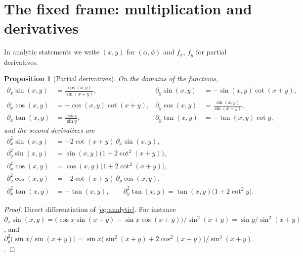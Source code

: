\documentclass[11pt]{amsart}
\newtheorem{prop}[thm]{Proposition}
\theoremstyle{definition}
\theoremstyle{remark}
\numberwithin{equation}{section}
\begin{document}
\section{The fixed frame: multiplication and derivatives}
\label{sec:calculus}

In analytic statements we write $(x,y)$ for $(\alpha,\phi)$ and
$f_x$, $f_y$ for partial derivatives.

\begin{prop}[Partial derivatives]
\label{prop:partials}
On the domains of the functions,
\begin{align*}
\partial_x \sin(x,y) &= \frac{\cos(x,y)}{\sin(x+y)}, &
\partial_y \sin(x,y) &= -\sin(x,y)\cot(x+y), \\
\partial_x \cos(x,y) &= -\cos(x,y)\cot(x+y), &
\partial_y \cos(x,y) &= \frac{\sin(x,y)}{\sin(x+y)}, \\
\partial_x \tan(x,y) &= \frac{\cos x}{\sin y}, &
\partial_y \tan(x,y) &= -\tan(x,y)\cot y,
\end{align*}
and the second derivatives are
\begin{align*}
\partial_x^2 \sin(x,y) &= -2\cot(x+y)\,\partial_x\sin(x,y), \\
\partial_y^2 \sin(x,y) &= \sin(x,y)\bigl(1 + 2\cot^2(x+y)\bigr), \\
\partial_x^2 \cos(x,y) &= \cos(x,y)\bigl(1 + 2\cot^2(x+y)\bigr), \\
\partial_y^2 \cos(x,y) &= -2\cot(x+y)\,\partial_y\cos(x,y), \\
\partial_x^2 \tan(x,y) &= -\tan(x,y), \qquad
\partial_y^2 \tan(x,y) = \tan(x,y)\bigl(1 + 2\cot^2 y\bigr).
\end{align*}
\end{prop}

\begin{proof}
Direct differentiation of \eqref{eq:analytic}. For instance
$\partial_x\sin(x,y) = \bigl(\cos x\sin(x+y) - \sin x\cos(x+y)\bigr)/\sin^2(x+y)
= \sin y/\sin^2(x+y)$, and
$\partial_y^2 \bigl(\sin x/\sin(x+y)\bigr)
= \sin x\bigl(\sin^2(x+y) + 2\cos^2(x+y)\bigr)/\sin^3(x+y)$.
\end{proof}
\end{document}
